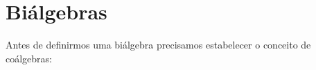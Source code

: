 \documentclass[twoside,openright,titlepage,numbers=noenddot,headinclude,  lineheaders footinclude=true,cleardoublepage=empty,
                                BCOR=5mm,paper=a4,fontsize=12pt ]{scrbook}
\theoremstyle{definition}
\begin{document}



\section{Bi\'algebras} \label{bialg}
Antes de definirmos uma biálgebra precisamos estabelecer o conceito de coálgebras:
\end{document}
